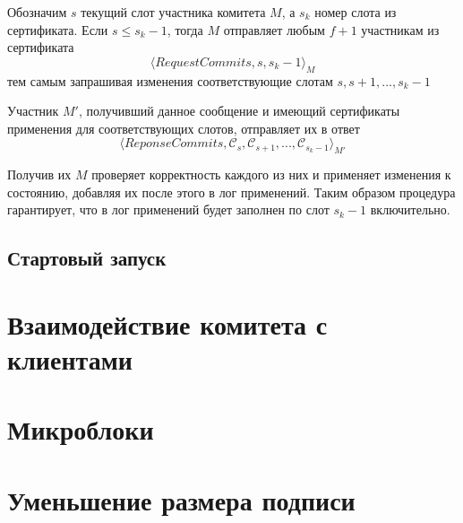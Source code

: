 Обозначим $s$ текущий слот участника комитета $M$, а $s_k$ номер слота из сертификата. Если $s \le s_k-1$, тогда $M$ отправляет любым $f+1$ участникам из сертификата 
\[ \langle RequestCommits, s, s_k-1 \rangle_M \]
тем самым запрашивая изменения соответствующие слотам $s, s+1,..., s_k-1$

Участник $M'$, получивший данное сообщение и имеющий сертификаты применения для соответствующих слотов, отправляет их в ответ
\[ \langle ReponseCommits, \mathcal{C}_s, \mathcal{C}_{s+1},...,\mathcal{C}_{s_k-1} \rangle_{M'} \]

Получив их $M$ проверяет корректность каждого из них и применяет изменения к состоянию, добавляя их после этого в лог применений. Таким образом процедура гарантирует, что в лог применений будет заполнен по слот $s_k-1$ включительно.

\subsection{Стартовый запуск}

\section{Взаимодействие комитета с клиентами}

\section{Микроблоки}

\section{Уменьшение размера подписи}


